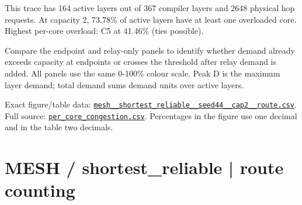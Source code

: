 \documentclass[10pt,a4paper]{article}
\begin{document}
This trace has 164 active layers out of 367 compiler layers and 2648 physical hop requests. At capacity 2, 73.78\% of active layers have at least one overloaded core. Highest per-core overload: C5 at 41.46\% (ties possible).\par
Compare the endpoint and relay-only panels to identify whether demand already exceeds capacity at endpoints or crosses the threshold after relay demand is added. All panels use the same 0-100\% colour scale. Peak D is the maximum layer demand; total demand sums demand units over active layers.\par
Exact figure/table data: \href{\detokenize{file:///home/dhruv-pansuriya/Documents/BTP/Compiler-Driven-ACE/output/pdf/qaoa_methods_congestion/tables/mesh__shortest_reliable__seed44__cap2__route.csv}}{\nolinkurl{mesh__shortest_reliable__seed44__cap2__route.csv}}. Full source: \href{\detokenize{file:///home/dhruv-pansuriya/Documents/BTP/Compiler-Driven-ACE/results/qaoa_2seed_2026-10-26/congestion/per_core_congestion.csv}}{\nolinkurl{per_core_congestion.csv}}. Percentages in the figure use one decimal and in the table two decimals.\par
\clearpage
\section*{MESH / shortest\_reliable | route counting}
\end{document}
